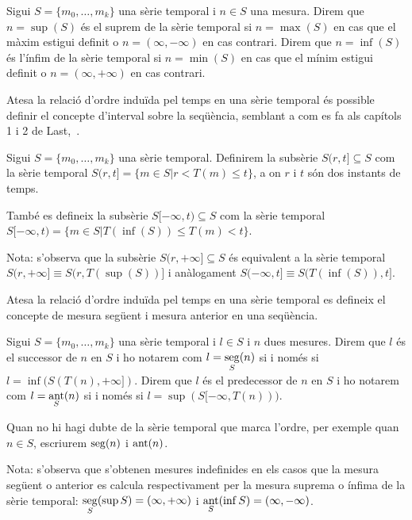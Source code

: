 \begin{definition}
  Sigui $S=\{m_0,\ldots,m_k\}$ una sèrie temporal i $n\in S$ una
  mesura.  Direm que $n=\sup(S)$ és el suprem de la sèrie temporal si
  $n=\max(S)$ en cas que el màxim estigui definit o
  $n=(\infty,-\infty)$ en cas contrari.  Direm que $n=\inf(S)$ és
  l'ínfim de la sèrie temporal si $n=\min(S)$ en cas que el mínim
  estigui definit o $n=(\infty,+\infty)$ en cas contrari.
\end{definition}


Atesa la relació d'ordre induïda pel temps en una sèrie temporal és
possible definir el concepte d'interval sobre la seqüència, semblant a
com es fa als capítols 1 i 2 de Last,~\cite{last}.

\begin{definition}
  Sigui $S=\{m_0, \ldots, m_k\}$ una sèrie temporal. Definirem la
  subsèrie $S(r,t] \subseteq S$ com la sèrie temporal $S(r,t]=\{m\in S
  | r<T(m)\leq t\}$, a on $r$ i $t$ són dos instants de temps.

  També es defineix la subsèrie $S[-\infty,t)\subseteq S$ com la sèrie
  temporal $S[-\infty,t) = \{m\in S | T(\inf(S))\leq T(m) < t\}$.
\end{definition}
Nota: s'observa que la subsèrie $S(r,+\infty]\subseteq S$ és
equivalent a la sèrie temporal $S(r,+\infty] \equiv S(r,T(\sup(S))]$ i
anàlogament $S(-\infty,t] \equiv S(T(\inf(S)),t]$.  
 
Atesa la relació d'ordre induïda pel temps en una sèrie temporal es
defineix el concepte de mesura següent i mesura anterior en una
seqüència.

\begin{definition}
  Sigui $S=\{m_0, \ldots, m_k\}$ una sèrie temporal i $l\in S$ i $n$ dues
  mesures. Direm que $l$ és el successor de $n$ en $S$ i ho notarem
  com $l=\operatorname*{seg}\limits_S(n)$ si i només si $l=\inf(S(T(n),+\infty])$.
  Direm que $l$ és el predecessor de $n$ en $S$ i ho notarem com
  $l=\operatorname*{ant}\limits_S(n)$ si i només si $l=\sup(S[-\infty,T(n)))$.
\end{definition}
Quan no hi hagi dubte de la sèrie temporal que marca l'ordre, per
exemple quan $n\in S$, escriurem $\operatorname*{seg}(n)$ i $\operatorname*{ant}(n)$.


Nota: s'observa que s'obtenen mesures indefinides en els casos que la
mesura següent o anterior es calcula respectivament per la mesura
suprema o ínfima de la sèrie temporal: $\operatorname*{seg}\limits_S(\sup
S)=(\infty,+\infty)$ i $\operatorname*{ant}\limits_S(\inf S)=(\infty,-\infty)$.

